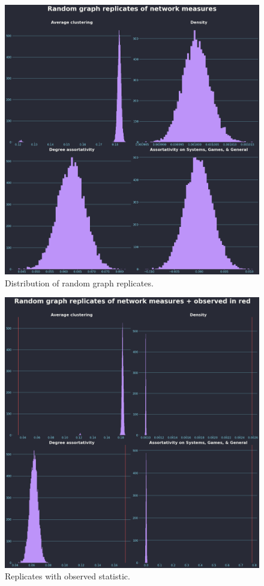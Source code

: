 \documentclass[12pt, a4paper]{article}
\begin{document}
\begin{figure}[ht!]
  \centering
  \includegraphics[width=\textwidth]{metrics_dist.png}
  \caption{Distribution of random graph replicates.}
  \label{fig:metricsdist}
\end{figure}

\begin{figure}[ht!]
  \centering
  \includegraphics[width=\textwidth]{metrics_dist_w_obs.png}
  \caption{Replicates with observed statistic.}
  \label{fig:metricwobs}
\end{figure}
\end{document}
